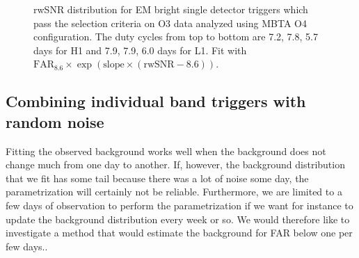 \begin{figure}
\begin{minipage}{0.9\linewidth}
  \end{minipage}
  \hfill
  \caption{rwSNR distribution for EM bright single detector triggers which pass the selection criteria on O3 data analyzed using MBTA O4 configuration. The duty cycles from top to bottom are 7.2, 7.8, 5.7 days for H1 and 7.9, 7.9, 6.0 days for L1. Fit with $\text{FAR$_{8.6}$} \times \exp(\text{slope} \times (\text{rwSNR}-8.6))$.}
  \label{fig:simple_fit}
\end{figure}





\subsection{Combining individual band triggers with random noise}

Fitting the observed background works well when the background does not change much from one day to another.
If, however, the background distribution that we fit has some tail because there was a lot of noise some day, the parametrization will certainly not be reliable.
Furthermore, we are limited to a few days of observation to perform the parametrization if we want for instance to update the background distribution every week or so.
We would therefore like to investigate a method that would estimate the background for FAR below one per few days..

